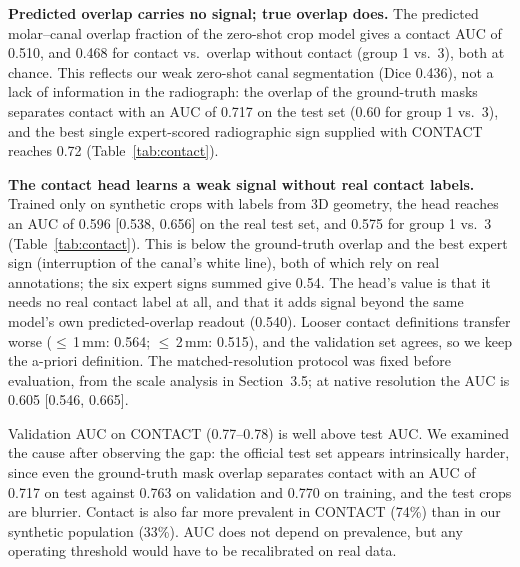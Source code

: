 \documentclass[preprint,12pt]{elsarticle}
\begin{document}
\textbf{Predicted overlap carries no signal; true overlap does.} The predicted molar--canal overlap fraction of the
zero-shot crop model gives a contact AUC of 0.510, and 0.468 for contact vs.\ overlap without contact (group 1 vs.\ 3),
both at chance. This reflects our weak zero-shot canal segmentation (Dice 0.436), not a lack of information in the
radiograph: the overlap of the ground-truth masks separates contact with an AUC of 0.717 on the test set (0.60 for
group 1 vs.\ 3), and the best single expert-scored radiographic sign supplied with CONTACT reaches 0.72
(Table~\ref{tab:contact}).

\textbf{The contact head learns a weak signal without real contact labels.} Trained only on synthetic crops with
labels from 3D geometry, the head reaches an AUC of 0.596 [0.538, 0.656] on the real test set, and 0.575 for group 1
vs.\ 3 (Table~\ref{tab:contact}). This is below the ground-truth overlap and the best expert sign (interruption of the
canal's white line), both of which rely on real annotations; the six expert signs summed give 0.54. The head's value is
that it needs no real contact label at all, and that it adds signal beyond the same model's own predicted-overlap
readout (0.540). Looser contact definitions transfer worse ($\leq$\,1\,mm: 0.564; $\leq$\,2\,mm: 0.515), and the
validation set agrees, so we keep the a-priori definition. The matched-resolution protocol was fixed before evaluation,
from the scale analysis in Section~3.5; at native resolution the AUC is 0.605 [0.546, 0.665].

Validation AUC on CONTACT (0.77--0.78) is well above test AUC. We examined the cause after observing the gap: the
official test set appears intrinsically harder, since even the ground-truth mask overlap separates contact with an AUC
of 0.717 on test against 0.763 on validation and 0.770 on training, and the test crops are blurrier. Contact is also far
more prevalent in CONTACT (74\%) than in our synthetic population (33\%). AUC does not depend on prevalence, but any
operating threshold would have to be recalibrated on real data.
\end{document}
